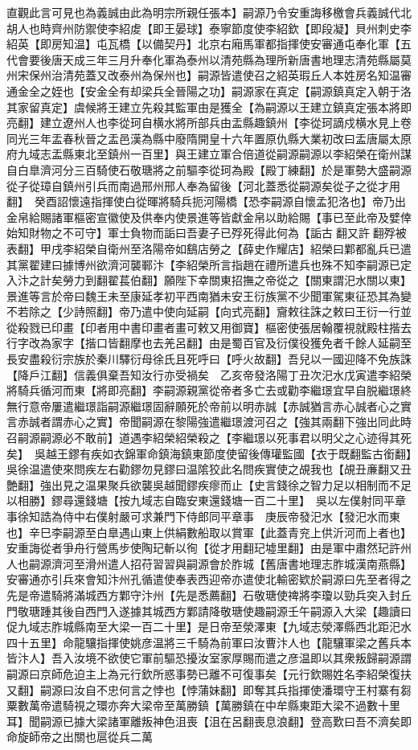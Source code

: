 直觀此言可見也為義誠由此為明宗所親任張本】嗣源乃令安重誨移檄會兵義誠代北胡人也時齊州防禦使李紹䖍【即王晏球】泰寧節度使李紹欽【即段凝】貝州刺史李紹英【即房知温】屯瓦橋【以備契丹】北京右廂馬軍都指揮使安審通屯奉化軍【五代會要後唐天成三年三月升奉化軍為泰州以清苑縣為理所新唐書地理志清苑縣屬莫州宋保州治清苑蓋又改泰州為保州也】嗣源皆遣使召之紹英瑕丘人本姓房名知温審通金全之姪也【安金全有却梁兵全晉陽之功】嗣源家在真定【嗣源鎮真定入朝于洛其家留真定】虞候將王建立先殺其監軍由是獲全【為嗣源以王建立鎮真定張本將即亮翻】建立遼州人也李從珂自横水將所部兵由盂縣趣鎮州【李從珂謫戍横水見上卷同光三年盂春秋晉之盂邑漢為縣中廢隋開皇十六年置原仇縣大業初改曰盂唐屬太原府九域志盂縣東北至鎮州一百里】與王建立軍合倍道從嗣源嗣源以李紹榮在衛州謀自白臯濟河分三百騎使石敬瑭將之前驅李從珂為殿【殿丁練翻】於是軍勢大盛嗣源從子從璋自鎮州引兵而南過邢州邢人奉為留後【河北蓋悉從嗣源矣從子之從才用翻】　癸酉詔懷遠指揮使白從暉將騎兵扼河陽橋【恐李嗣源自懷孟犯洛也】帝乃出金帛給賜諸軍樞密宣徽使及供奉内使景進等皆獻金帛以助給賜【事已至此帝及嬖倖始知財物之不可守】軍士負物而詬曰吾妻子已殍死得此何為【詬古翻又許翻殍被表翻】甲戌李紹榮自衛州至洛陽帝如鷂店勞之【薛史作耀店】紹榮曰鄴都亂兵已遣其黨翟建曰據博州欲濟河襲鄆汴【李紹榮所言指趙在禮所遣兵也殊不知李嗣源已定入汴之計矣勞力到翻翟萇伯翻】願陛下幸關東招撫之帝從之【關東謂汜水關以東】　景進等言於帝曰魏王未至康延孝初平西南猶未安王衍族黨不少聞軍駕東征恐其為變不若除之【少詩照翻】帝乃遣中使向延嗣【向式亮翻】齎敕往誅之敕曰王衍一行並從殺戮已印畫【印者用中書印畫者畫可敕又用御寶】樞密使張居翰覆視就殿柱揩去行字改為家字【揩口皆翻摩也去羌呂翻】由是蜀百官及衍僕役獲免者千餘人延嗣至長安盡殺衍宗族於秦川驛衍母徐氏且死呼曰【呼火故翻】吾兒以一國迎降不免族誅【降戶江翻】信義俱棄吾知汝行亦受禍矣　乙亥帝發洛陽丁丑次汜水戊寅遣李紹榮將騎兵循河而東【將即亮翻】李嗣源親黨從帝者多亡去或勸李繼璟宜早自脱繼璟終無行意帝屢遣繼璟詣嗣源繼璟固辭願死於帝前以明赤誠【赤誠猶言赤心誠者心之實言赤誠者謂赤心之實】帝聞嗣源在黎陽強遣繼璟渡河召之【強其兩翻下強出同此時召嗣源嗣源必不敢前】道遇李紹榮紹榮殺之【李繼璟以死事君以明父之心迹得其死矣】　吳越王鏐有疾如衣錦軍命鎮海鎮東節度使留後傳瓘監國【衣于既翻監古銜翻】吳徐温遣使來問疾左右勸鏐勿見鏐曰温隂狡此名問疾實使之覘我也【覘丑亷翻又丑艶翻】強出見之温果聚兵欲襲吳越聞鏐疾瘳而止【史言錢徐之智力足以相制而不足以相勝】鏐尋還錢塘【按九域志自臨安東還錢塘一百二十里】　吳以左僕射同平章事徐知誥為侍中右僕射嚴可求兼門下侍郎同平章事　庚辰帝發汜水【發汜水而東也】辛巳李嗣源至白臯遇山東上供絹數船取以賞軍【此蓋青兖上供沂河而上者也】安重誨從者爭舟行營馬步使陶玘斬以徇【從才用翻玘墟里翻】由是軍中肅然玘許州人也嗣源濟河至滑州遣人招苻習習與嗣源會於胙城【舊唐書地理志胙城漢南燕縣】安審通亦引兵來會知汴州孔循遣使奉表西迎帝亦遣使北輸密欵於嗣源曰先至者得之先是帝遣騎將滿城西方鄴守汴州【先是悉薦翻】石敬瑭使禆將李瓊以勁兵突入封丘門敬瑭踵其後自西門入遂據其城西方鄴請降敬瑭使趣嗣源壬午嗣源入大梁【趣讀曰促九域志胙城縣南至大梁一百二十里】是日帝至滎澤東【九域志滎澤縣西北距汜水四十五里】命龍驤指揮使姚彦温將三千騎為前軍曰汝曹汴人也【龍驤軍梁之舊兵本皆汴人】吾入汝境不欲使它軍前驅恐擾汝室家厚賜而遣之彦温即以其衆叛歸嗣源謂嗣源曰京師危迫主上為元行欽所惑事勢已離不可復事矣【元行欽賜姓名李紹榮復扶又翻】嗣源曰汝自不忠何言之悖也【悖蒲妹翻】即奪其兵指揮使潘環守王村寨有芻粟數萬帝遣騎視之環亦奔大梁帝至萬勝鎮【萬勝鎮在中牟縣東距大梁不過數十里耳】聞嗣源已據大梁諸軍離叛神色沮喪【沮在呂翻喪息浪翻】登高歎曰吾不濟矣即命旋師帝之出關也扈從兵二萬